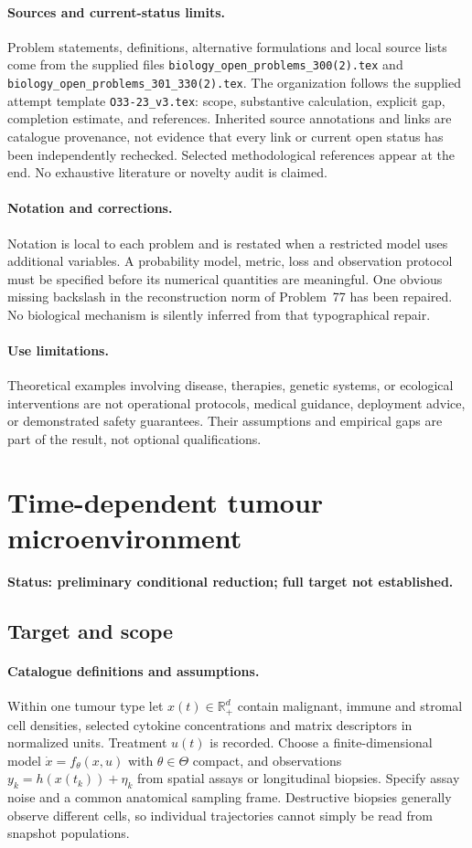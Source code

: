\documentclass[11pt]{article}
\begin{document}
\paragraph{Sources and current-status limits.}
Problem statements, definitions, alternative formulations and local source lists
come from the supplied files
\texttt{biology\_open\_problems\_300(2).tex} and
\texttt{biology\_open\_problems\_301\_330(2).tex}.
The organization follows the supplied attempt template
\texttt{O33-23\_v3.tex}: scope, substantive calculation, explicit gap,
completion estimate, and references. Inherited source annotations and links are
catalogue provenance, not evidence that every link or current open status has
been independently rechecked. Selected methodological references appear at the
end. No exhaustive literature or novelty audit is claimed.

\paragraph{Notation and corrections.}
Notation is local to each problem and is restated when a restricted model uses
additional variables. A probability model, metric, loss and observation protocol
must be specified before its numerical quantities are meaningful. One obvious
missing backslash in the reconstruction norm of Problem~77 has been repaired.
No biological mechanism is silently inferred from that typographical repair.

\paragraph{Use limitations.}
Theoretical examples involving disease, therapies, genetic systems, or ecological
interventions are not operational protocols, medical guidance, deployment advice,
or demonstrated safety guarantees. Their assumptions and empirical gaps are part
of the result, not optional qualifications.


\section*{Time-dependent tumour microenvironment}
\label{prob:252}
\noindent\textbf{Status: preliminary conditional reduction; full target not established.}
\subsection{Target and scope}
\paragraph{Catalogue definitions and assumptions.}
Within one tumour type let $x(t)\in\mathbb{R}_+^d$ contain malignant, immune and stromal cell densities, selected cytokine concentrations and matrix descriptors in normalized units. Treatment $u(t)$ is recorded. Choose a finite-dimensional model $\dot x=f_\theta(x,u)$ with $\theta\in\Theta$ compact, and observations $y_k=h(x(t_k))+\eta_k$ from spatial assays or longitudinal biopsies. Specify assay noise and a common anatomical sampling frame. Destructive biopsies generally observe different cells, so individual trajectories cannot simply be read from snapshot populations.
\end{document}
